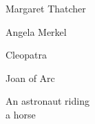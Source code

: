 \begin{figure*}[]
\vspace{1ex}
\begin{minipage}[t]{.025\textwidth}
     \vspace{0pt}
\end{minipage}%
\hspace{1ex}%
\begin{minipage}[t]{0.98\textwidth}
    \vspace{2mm}
    \begin{minipage}[t]{0.2\textwidth}
        \centering
        Margaret Thatcher
    \end{minipage}%
    \begin{minipage}[t]{0.2\textwidth}
        \centering
        Angela Merkel
    \end{minipage}%
    \begin{minipage}[t]{0.2\textwidth}
        \centering
        Cleopatra
    \end{minipage}%
    \begin{minipage}[t]{0.2\textwidth}
        \centering
        Joan of Arc
    \end{minipage}%
    \begin{minipage}[t]{0.2\textwidth}
        \centering
        An astronaut riding\\a horse
    \end{minipage}%
\end{minipage}


\end{figure*}
